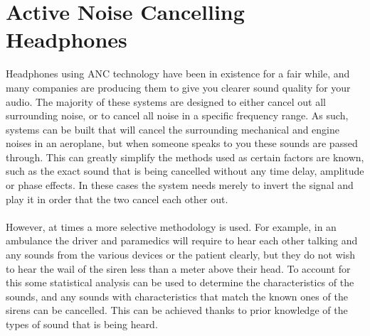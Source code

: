 \section{Active Noise Cancelling Headphones}
Headphones using ANC technology have been in existence for a fair while, and many companies are producing them to give you clearer sound quality for your audio.
The majority of these systems are designed to either cancel out all surrounding noise, or to cancel all noise in a specific frequency range.
As such, systems can be built that will cancel the surrounding mechanical and engine noises in an aeroplane, but when someone speaks to you these sounds are passed through.
This can greatly simplify the methods used as certain factors are known, such as the exact sound that is being cancelled without any time delay, amplitude or phase effects.
In these cases the system needs merely to invert the signal and play it in order that the two cancel each other out\cite{EMNoiseCancel}.
\\
\\
However, at times a more selective methodology is used. For example, in an ambulance the driver and paramedics will require to hear each other talking and any sounds from the various devices or the patient clearly, but they do not wish to hear the wail of the siren less than a meter above their head\cite{EMHeadsets}.
To account for this some statistical analysis can be used to determine the characteristics of the sounds, and any sounds with characteristics that match the known ones of the sirens can be cancelled.
This can be achieved thanks to prior knowledge of the types of sound that is being heard.
